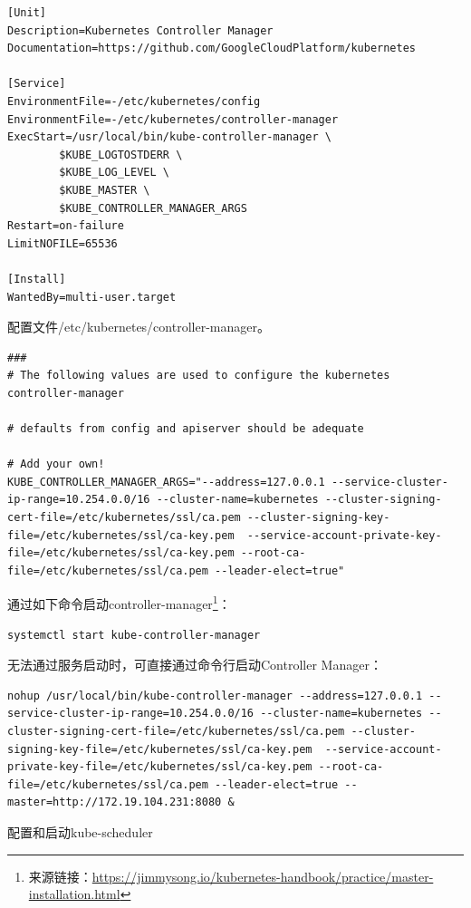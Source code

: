 \documentclass[8pt]{book}
\makeatletter
\numberwithin{dummy}{section}
\theoremstyle{ocrenumbox}
\theoremstyle{blacknumex}
\theoremstyle{blacknumbox}
\theoremstyle{ocrenum}
\renewcommand\paragraph{\@startsection{paragraph}{4}{\z@}
	{-2ex \@plus-.2ex \@minus .2ex}
	{.1ex}
	{\normalfont\small\sffamily\bfseries}}
\makeatother
\begin{document}
\begin{lstlisting}
[Unit]
Description=Kubernetes Controller Manager
Documentation=https://github.com/GoogleCloudPlatform/kubernetes

[Service]
EnvironmentFile=-/etc/kubernetes/config
EnvironmentFile=-/etc/kubernetes/controller-manager
ExecStart=/usr/local/bin/kube-controller-manager \
        $KUBE_LOGTOSTDERR \
        $KUBE_LOG_LEVEL \
        $KUBE_MASTER \
        $KUBE_CONTROLLER_MANAGER_ARGS
Restart=on-failure
LimitNOFILE=65536

[Install]
WantedBy=multi-user.target
\end{lstlisting}

配置文件/etc/kubernetes/controller-manager。

\begin{lstlisting}
###
# The following values are used to configure the kubernetes controller-manager

# defaults from config and apiserver should be adequate

# Add your own!
KUBE_CONTROLLER_MANAGER_ARGS="--address=127.0.0.1 --service-cluster-ip-range=10.254.0.0/16 --cluster-name=kubernetes --cluster-signing-cert-file=/etc/kubernetes/ssl/ca.pem --cluster-signing-key-file=/etc/kubernetes/ssl/ca-key.pem  --service-account-private-key-file=/etc/kubernetes/ssl/ca-key.pem --root-ca-file=/etc/kubernetes/ssl/ca.pem --leader-elect=true"
\end{lstlisting}

通过如下命令启动controller-manager\footnote{来源链接：\url{https://jimmysong.io/kubernetes-handbook/practice/master-installation.html}}：

\begin{lstlisting}[language=Bash]
systemctl start kube-controller-manager
\end{lstlisting}

无法通过服务启动时，可直接通过命令行启动Controller Manager：

\begin{lstlisting}
nohup /usr/local/bin/kube-controller-manager --address=127.0.0.1 --service-cluster-ip-range=10.254.0.0/16 --cluster-name=kubernetes --cluster-signing-cert-file=/etc/kubernetes/ssl/ca.pem --cluster-signing-key-file=/etc/kubernetes/ssl/ca-key.pem  --service-account-private-key-file=/etc/kubernetes/ssl/ca-key.pem --root-ca-file=/etc/kubernetes/ssl/ca.pem --leader-elect=true --master=http://172.19.104.231:8080 &
\end{lstlisting}

\paragraph{配置和启动kube-scheduler}
\end{document}
